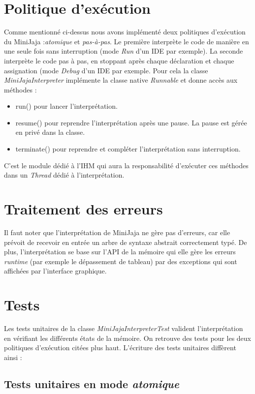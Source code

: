 \documentclass[a4paper,12pt]{article}
\begin{document}
\section{Politique d'exécution}  
Comme mentionné ci-dessus nous avons implémenté deux politiques \linebreak d'exécution du MiniJaja :\emph{atomique} et \emph{pas-à-pas}. 
Le première interprète le code de manière en une seule fois sans interruption (mode \emph{Run} d'un IDE par exemple).
La seconde interprète le code pas à pas, en stoppant après chaque déclaration et chaque assignation (mode \emph{Debug} d'un IDE par exemple. Pour cela la classe \emph{MiniJajaInterpreter} implémente la classe native \emph{Runnable} et donne accès aux méthodes :
\begin{itemize}
\item run() pour lancer l'interprétation.
\item resume() pour reprendre l'interprétation après une pause. La pause est gérée en privé dans la classe.
\item terminate() pour reprendre et compléter l'interprétation sans interruption.
\end{itemize}
C'est le module dédié à l'IHM qui aura la responsabilité d'exécuter ces méthodes dans un \emph{Thread} dédié à l'interprétation.

\section{Traitement des erreurs}
Il faut noter que l'interprétation de MiniJaja ne gère pas d'erreurs, car elle prévoit de recevoir en entrée un arbre de syntaxe abstrait correctement typé.
De plus, l'interprétation se base sur l'API de la mémoire qui elle gère les erreurs \emph{runtime} (par exemple le dépassement de tableau) par des exceptions qui sont affichées par l'interface graphique.

\section{Tests}
Les tests unitaires de la classe \emph{MiniJajaInterpreterTest} valident l'interprétation en vérifiant les différents états de la mémoire.
On retrouve des tests pour les deux politiques d'exécution citées plus haut. L'écriture des tests unitaires diffèrent ainsi :

\subsection{Tests unitaires en mode \emph{atomique}}
\end{document}
